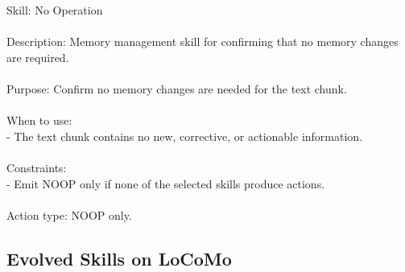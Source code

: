 \begin{center}
\begin{tcolorbox}[title={Initial Primitive Skill - SKIP}]
{
Skill: No Operation \\\\
Description: Memory management skill for confirming that no memory changes are required. \\\\
Purpose: Confirm no memory changes are needed for the text chunk. \\\\
When to use: \\
- The text chunk contains no new, corrective, or actionable information. \\\\
Constraints: \\
- Emit NOOP only if none of the selected skills produce actions. \\\\
Action type: NOOP only.
}
\label{appendix:case_noop}
\end{tcolorbox}
\end{center}





\subsection{Evolved Skills on LoCoMo}




